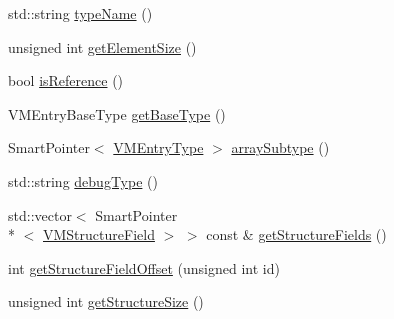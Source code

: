 \begin{DoxyCompactItemize}
\item 
std\-::string \hyperlink{class_v_m_1_1_v_m_entry_type_ac4220642624d606264083b1ef60cca4f}{type\-Name} ()
\item 
unsigned int \hyperlink{class_v_m_1_1_v_m_entry_type_a98c2ca6402f1ad3068ed46f6138e905c}{get\-Element\-Size} ()
\item 
bool \hyperlink{class_v_m_1_1_v_m_entry_type_a284a434c44410a8474ee988502dd9bb0}{is\-Reference} ()
\item 
V\-M\-Entry\-Base\-Type \hyperlink{class_v_m_1_1_v_m_entry_type_a4ddbfa9120423d037e0577028e7d7eeb}{get\-Base\-Type} ()
\item 
Smart\-Pointer$<$ \hyperlink{class_v_m_1_1_v_m_entry_type}{V\-M\-Entry\-Type} $>$ \hyperlink{class_v_m_1_1_v_m_entry_type_aba116868d3a2af6704c86c16f67f546e}{array\-Subtype} ()
\item 
std\-::string \hyperlink{class_v_m_1_1_v_m_entry_type_a239a745a61ac8051bb7ac72210bfee42}{debug\-Type} ()
\item 
std\-::vector$<$ Smart\-Pointer\\*
$<$ \hyperlink{class_v_m_1_1_v_m_structure_field}{V\-M\-Structure\-Field} $>$ $>$ const \& \hyperlink{class_v_m_1_1_v_m_entry_type_a278f76fb711fbca0eafddad6a6342ece}{get\-Structure\-Fields} ()
\item 
int \hyperlink{class_v_m_1_1_v_m_entry_type_a20b457c5cdbfee3839b2cdf0213cba96}{get\-Structure\-Field\-Offset} (unsigned int id)
\item 
unsigned int \hyperlink{class_v_m_1_1_v_m_entry_type_affa37faa49a60b7b3f913bf1cc3f5730}{get\-Structure\-Size} ()
\end{DoxyCompactItemize}


